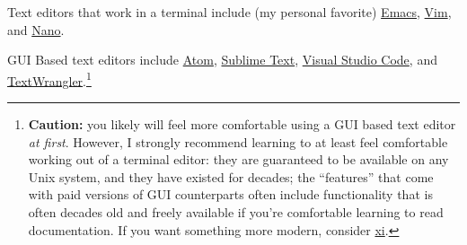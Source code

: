 \documentclass[12pt,letterpaper,twoside]{article}
\begin{document}
Text editors that work in a terminal include (my personal favorite)
\href{https://www.gnu.org/software/emacs/}{Emacs},
\href{http://www.vim.org/}{Vim}, and
\href{https://www.nano-editor.org/}{Nano}. 

GUI Based text editors include \href{https://atom.io/}{Atom}, 
\href{https://www.sublimetext.com/}{Sublime Text},
\href{https://code.visualstudio.com/}{Visual Studio Code},
and
\href{http://www.barebones.com/products/textwrangler/}{TextWrangler}.\footnote{
  \textbf{Caution:} 
  you likely will feel more comfortable using a GUI based text editor
  \emph{at first}. However, I strongly recommend learning to at least
  feel comfortable working out of a terminal editor: they are guaranteed
  to be available on any Unix system, and they have existed for decades;
  the ``features''  that come with paid versions of GUI counterparts
  often include functionality that is often decades old and freely
  available if you're comfortable learning to read documentation.
If you want something more
modern, consider
\href{https://github.com/xi-editor/xi-editor}{xi}.
}
\vspace{-28pt}
\end{document}
